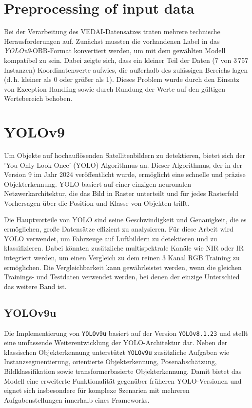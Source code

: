 \section{Preprocessing of input data}
Bei der Verarbeitung des VEDAI-Datensatzes traten mehrere technische Herausforderungen auf. 
Zunächst mussten die vorhandenen Label in das \textit{YOLOv9}-OBB-Format konvertiert werden, um mit dem gewählten Modell kompatibel zu sein. 
Dabei zeigte sich, dass ein kleiner Teil der Daten (7 von 3\,757 Instanzen) Koordinatenwerte aufwies, die außerhalb des zulässigen Bereichs lagen (d.\,h. kleiner als 0 oder größer als 1). 
Dieses Problem wurde durch den Einsatz von Exception Handling sowie durch Rundung der Werte auf den gültigen Wertebereich behoben. 

\section{YOLOv9}
Um Objekte auf hochauflösenden Satellitenbildern zu detektieren, bietet sich der 'You Only Look Once' (YOLO) Algorithmus an. Dieser Algorithmus, der in der Version 9 im Jahr 2024 veröffentlicht wurde, ermöglicht eine schnelle und präzise Objekterkennung. YOLO basiert auf einer einzigen neuronalen Netzwerkarchitektur, die das Bild in Raster unterteilt und für jedes Rasterfeld Vorhersagen über die Position und Klasse von Objekten trifft. 

Die Hauptvorteile von YOLO sind seine Geschwindigkeit und Genauigkeit, die es ermöglichen, große Datensätze effizient zu analysieren. Für diese Arbeit wird YOLO verwendet, um Fahrzeuge auf Luftbildern zu detektieren und zu klassifizieren. Dabei könnten zusätzliche multispektrale Kanäle wie NIR oder IR integriert werden, um einen Vergleich zu dem reinen 3 Kanal RGB Training zu ermöglichen. Die Vergleichbarkeit kann gewährleistet werden, wenn die gleichen Trainings- und Testdaten verwendet werden, bei denen der einzige Unterschied das weitere Band ist.

\subsection{YOLOv9u}

Die Implementierung von \texttt{YOLOv9u} basiert auf der Version \texttt{YOLOv8.1.23}\cite{yolo_v9u_github} und stellt eine umfassende Weiterentwicklung der YOLO-Architektur dar. Neben der klassischen Objekterkennung unterstützt \texttt{YOLOv9u} zusätzliche Aufgaben wie Instanzsegmentierung, orientierte Objekterkennung, Posenabschätzung, Bildklassifikation sowie transformerbasierte Objekterkennung\cite{wang2024yolov9}. Damit bietet das Modell eine erweiterte Funktionalität gegenüber früheren YOLO-Versionen und eignet sich insbesondere für komplexe Szenarien mit mehreren Aufgabenstellungen innerhalb eines Frameworks.


